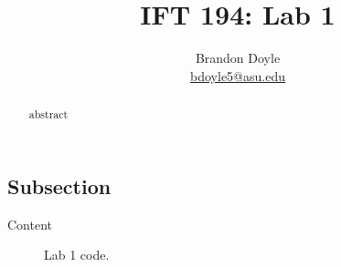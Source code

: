 \documentclass[leqno, 11pt, a4paper]{article}
\title{IFT 194: Lab 1}
\author{Brandon Doyle\\
\href{mailto:bdoyle@asu.edu}{bdoyle5@asu.edu}}
\begin{document}
\maketitle
\begin{abstract}
  abstract
\end{abstract}
\subsection*{Subsection}
Content
\newpage
\begin{figure}[t!]
  \centering
    
    \caption{Lab 1 code.}
    \label{fig:one}
\end{figure}
\end{document}
